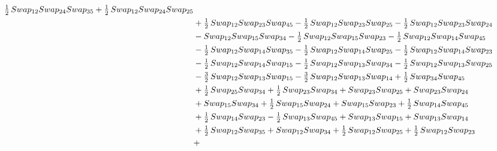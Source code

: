 \documentclass[10pt,a4paper]{amsart}
\begin{document}
\begin{align*}
        \tfrac12\,\textnormal{Swap}_{12} \textnormal{Swap}_{24} \textnormal{Swap}_{35} + \tfrac12\,\textnormal{Swap}_{12} \textnormal{Swap}_{24} \textnormal{Swap}_{25}\\ & + \tfrac12\,\textnormal{Swap}_{12} \textnormal{Swap}_{23} \textnormal{Swap}_{45} - \tfrac12\,\textnormal{Swap}_{12} \textnormal{Swap}_{23} \textnormal{Swap}_{25} -
        \tfrac12\,\textnormal{Swap}_{12} \textnormal{Swap}_{23} \textnormal{Swap}_{24}\\ & - \textnormal{Swap}_{12} \textnormal{Swap}_{15} \textnormal{Swap}_{34} - \tfrac12\,\textnormal{Swap}_{12} \textnormal{Swap}_{15} \textnormal{Swap}_{23} - \tfrac12\,\textnormal{Swap}_{12} \textnormal{Swap}_{14} \textnormal{Swap}_{45} \\ & -
        \tfrac12\,\textnormal{Swap}_{12} \textnormal{Swap}_{14} \textnormal{Swap}_{35} - \tfrac12\,\textnormal{Swap}_{12} \textnormal{Swap}_{14} \textnormal{Swap}_{25} - \tfrac12\,\textnormal{Swap}_{12} \textnormal{Swap}_{14} \textnormal{Swap}_{23} \\ & - \tfrac12\,\textnormal{Swap}_{12} \textnormal{Swap}_{14} \textnormal{Swap}_{15} -
        \tfrac12\,\textnormal{Swap}_{12} \textnormal{Swap}_{13} \textnormal{Swap}_{34} - \tfrac12\,\textnormal{Swap}_{12} \textnormal{Swap}_{13} \textnormal{Swap}_{25}\\ & - \tfrac32\,\textnormal{Swap}_{12} \textnormal{Swap}_{13} \textnormal{Swap}_{15} - \tfrac32\,\textnormal{Swap}_{12} \textnormal{Swap}_{13} \textnormal{Swap}_{14} +
        \tfrac12\,\textnormal{Swap}_{34} \textnormal{Swap}_{45} \\ & + \tfrac12\,\textnormal{Swap}_{25} \textnormal{Swap}_{34} + \tfrac12\,\textnormal{Swap}_{23} \textnormal{Swap}_{34} + \textnormal{Swap}_{23} \textnormal{Swap}_{25} + \textnormal{Swap}_{23} \textnormal{Swap}_{24} \\ & + \textnormal{Swap}_{15} \textnormal{Swap}_{34} +
        \tfrac12\,\textnormal{Swap}_{15} \textnormal{Swap}_{24} + \textnormal{Swap}_{15} \textnormal{Swap}_{23} + \tfrac12\,\textnormal{Swap}_{14} \textnormal{Swap}_{45} \\ & + \tfrac12\,\textnormal{Swap}_{14} \textnormal{Swap}_{23} - \tfrac12\,\textnormal{Swap}_{13} \textnormal{Swap}_{45} +
        \textnormal{Swap}_{13} \textnormal{Swap}_{15} + \textnormal{Swap}_{13} \textnormal{Swap}_{14} \\ & + \tfrac12\,\textnormal{Swap}_{12} \textnormal{Swap}_{35} + \textnormal{Swap}_{12} \textnormal{Swap}_{34} + \tfrac12\,\textnormal{Swap}_{12} \textnormal{Swap}_{25} + \tfrac12\,\textnormal{Swap}_{12} \textnormal{Swap}_{23} \\ & +

\end{align*}
\end{document}

